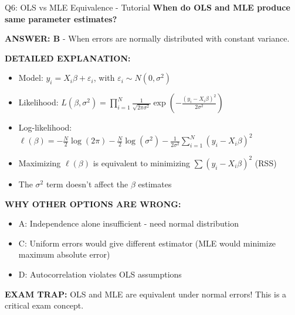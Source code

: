 \documentclass[8pt]{beamer}
\begin{document}
	\begin{frame}{Q6: OLS vs MLE Equivalence - Tutorial}
		\fontsize{6.5}{7.5}\selectfont
		\textbf{When do OLS and MLE produce same parameter estimates?}
		
		\vspace{0.05cm}
		\textcolor{myblue}{\textbf{ANSWER: B}} - When errors are normally distributed with constant variance.
		
		\vspace{0.05cm}
		\textbf{DETAILED EXPLANATION:}
		\begin{itemize}
			\item Model: $y_i = X_i\beta + \varepsilon_i$, with $\varepsilon_i \sim N(0, \sigma^2)$
			\item Likelihood: $L(\beta, \sigma^2) = \prod_{i=1}^N \frac{1}{\sqrt{2\pi\sigma^2}} \exp\left(-\frac{(y_i - X_i\beta)^2}{2\sigma^2}\right)$
			\item Log-likelihood: $\ell(\beta) = -\frac{N}{2}\log(2\pi) - \frac{N}{2}\log(\sigma^2) - \frac{1}{2\sigma^2}\sum_{i=1}^N (y_i - X_i\beta)^2$
			\item Maximizing $\ell(\beta)$ is equivalent to minimizing $\sum (y_i - X_i\beta)^2$ (RSS)
			\item The $\sigma^2$ term doesn't affect the $\beta$ estimates
		\end{itemize}
		
		\vspace{0.05cm}
		\textcolor{myred}{\textbf{WHY OTHER OPTIONS ARE WRONG:}}
		\begin{itemize}
			\item \textcolor{myred}{A:} Independence alone insufficient - need normal distribution
			\item \textcolor{myred}{C:} Uniform errors would give different estimator (MLE would minimize maximum absolute error)
			\item \textcolor{myred}{D:} Autocorrelation violates OLS assumptions
		\end{itemize}
		
		\textcolor{myred}{\textbf{EXAM TRAP:}} OLS and MLE are \textcolor{myblue}{equivalent} under normal errors! This is a critical exam concept.
	\end{frame}
	
\end{document}
